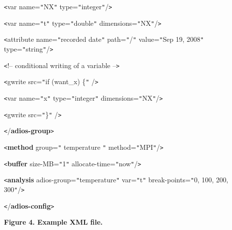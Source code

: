 \parindent=28pt
\texttt{<}var name=\texttt{"}NX\texttt{"} type=\texttt{"}integer\texttt{"}/\texttt{>}

\texttt{<}var name=\texttt{"}t\texttt{"} type=\texttt{"}double\texttt{"} dimensions=\texttt{"}NX\texttt{"}/\texttt{>}

\parindent=57pt
\texttt{<}attribute name=\texttt{"}recorded date\texttt{"} path=\texttt{"}/\texttt{"} 
value=\texttt{"}Sep 19, 2008\texttt{"} type=\texttt{"}string\texttt{"}/\texttt{>}

\parindent=28pt
{\color{color26} \texttt{<}!-- conditional writing of a variable --\texttt{>}}

\parindent=0pt
\texttt{<}gwrite src=\texttt{"}if (want\_x) \{\texttt{"} /\texttt{>}

\parindent=43pt
\texttt{<}var name=\texttt{"}x\texttt{"} type=\texttt{"}integer\texttt{"} dimensions=\texttt{"}NX\texttt{"}/\texttt{>}

\parindent=0pt
\texttt{<}gwrite src=\texttt{"}\}\texttt{"} /\texttt{>}

\parindent=14pt
\texttt{<}/\textbf{adios-group}\texttt{>}

\texttt{<}\textbf{method} group=\texttt{"} temperature \texttt{"} method=\texttt{"}MPI\texttt{"}/\texttt{>}

\texttt{<}\textbf{buffer} size-MB=\texttt{"}1\texttt{"} allocate-time=\texttt{"}now\texttt{"}/\texttt{>}

\texttt{<}\textbf{analysis }adios-group=\texttt{"}temperature\texttt{"} var=\texttt{"}t\texttt{"} 
break-points=\texttt{"}0, 100, 200, 300\texttt{"}/\texttt{>}

\parindent=0pt
\texttt{<}/\textbf{adios-config}\texttt{>}

\label{HRef119578444}\label{HToc144350163}

\leftskip=18pt
{\color{color20} \textbf{Figure 4. Example XML file.\label{HToc84890255}\label{HToc212016631}\label{HToc212016873}\label{HRef212367123}\label{HToc82067526}\label{HRef278374025}\label{HRef278895952}\label{HToc182553379}}}
